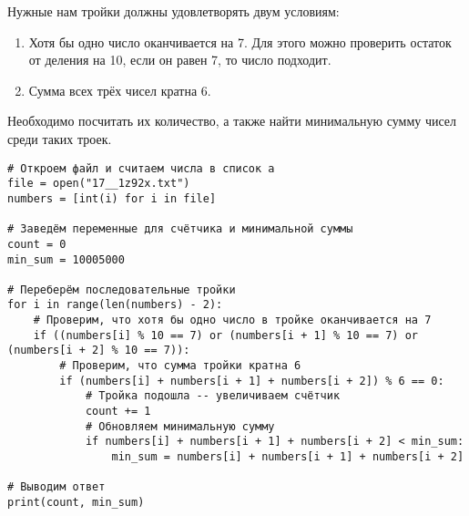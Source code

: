 \documentclass[14pt,a4paper]{article}
\begin{document}
Нужные нам тройки должны удовлетворять двум условиям:
\begin{enumerate}
    \item Хотя бы одно число оканчивается на 7. Для этого можно
        проверить остаток от деления на 10, если он равен 7, то число
        подходит. \\
    \item Сумма всех трёх чисел кратна 6. \\
\end{enumerate}
Необходимо посчитать их количество, а также найти минимальную сумму
чисел среди таких троек.

\begin{verbatim}
# Откроем файл и считаем числа в список a
file = open("17__1z92x.txt")
numbers = [int(i) for i in file]

# Заведём переменные для счётчика и минимальной суммы
count = 0
min_sum = 10005000

# Переберём последовательные тройки
for i in range(len(numbers) - 2):
    # Проверим, что хотя бы одно число в тройке оканчивается на 7
    if ((numbers[i] % 10 == 7) or (numbers[i + 1] % 10 == 7) or (numbers[i + 2] % 10 == 7)):
        # Проверим, что сумма тройки кратна 6
        if (numbers[i] + numbers[i + 1] + numbers[i + 2]) % 6 == 0:
            # Тройка подошла -- увеличиваем счётчик
            count += 1
            # Обновляем минимальную сумму
            if numbers[i] + numbers[i + 1] + numbers[i + 2] < min_sum:
                min_sum = numbers[i] + numbers[i + 1] + numbers[i + 2]

# Выводим ответ
print(count, min_sum)
\end{verbatim}
\end{document}
